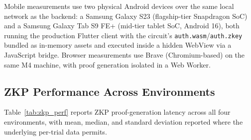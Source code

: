 \documentclass[journal,twoside,10pt]{IEEEtran}
\begin{document}
Mobile measurements use two physical Android devices over the same local
network as the backend: a Samsung Galaxy S23 (flagship-tier Snapdragon
SoC) and a Samsung Galaxy Tab S9 FE+ (mid-tier tablet SoC, Android 16),
both running the production Flutter client with the circuit's
\texttt{auth.wasm}/\texttt{auth.zkey} bundled as in-memory assets and
executed inside a hidden WebView via a JavaScript bridge. Browser
measurements use Brave (Chromium-based) on the same M4 machine, with proof
generation isolated in a Web Worker.

\subsection{ZKP Performance Across Environments}
Table~\ref{tab:zkp_perf} reports ZKP proof-generation latency across all
four environments, with mean, median, and standard deviation reported
where the underlying per-trial data permits.
\end{document}
